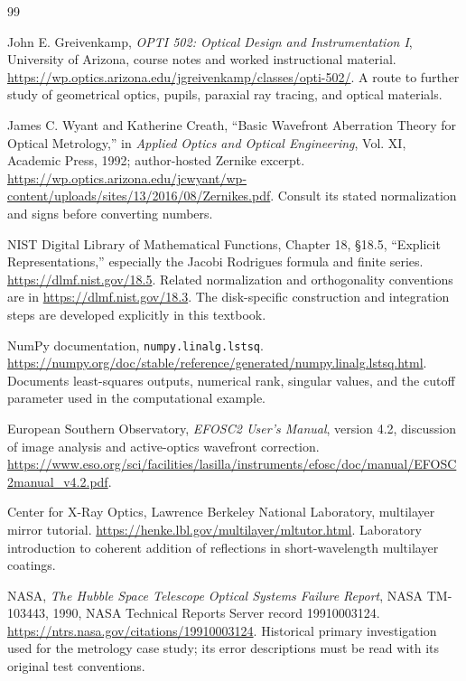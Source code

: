 \begin{thebibliography}{99}
\raggedright
{}
John E. Greivenkamp, \emph{OPTI 502: Optical Design and Instrumentation I},
University of Arizona, course notes and worked instructional material.
\url{https://wp.optics.arizona.edu/jgreivenkamp/classes/opti-502/}.
A route to further study of geometrical optics, pupils, paraxial
ray tracing, and optical materials.

James C. Wyant and Katherine Creath, ``Basic Wavefront Aberration Theory
for Optical Metrology,'' in \emph{Applied Optics and Optical Engineering},
Vol. XI, Academic Press, 1992; author-hosted Zernike excerpt.
\url{https://wp.optics.arizona.edu/jcwyant/wp-content/uploads/sites/13/2016/08/Zernikes.pdf}.
Consult its stated normalization and signs before converting numbers.

NIST Digital Library of Mathematical Functions, Chapter 18,
\S18.5, ``Explicit Representations,'' especially the Jacobi Rodrigues
formula and finite series.
\url{https://dlmf.nist.gov/18.5}.
Related normalization and orthogonality conventions are in
\url{https://dlmf.nist.gov/18.3}.
The disk-specific construction and integration steps are developed
explicitly in this textbook.

NumPy documentation, \texttt{numpy.linalg.lstsq}.
\url{https://numpy.org/doc/stable/reference/generated/numpy.linalg.lstsq.html}.
Documents least-squares outputs, numerical rank, singular values,
and the cutoff parameter used in the computational example.

European Southern Observatory, \emph{EFOSC2 User's Manual}, version 4.2,
discussion of image analysis and active-optics wavefront correction.
\url{https://www.eso.org/sci/facilities/lasilla/instruments/efosc/doc/manual/EFOSC2manual_v4.2.pdf}.

Center for X-Ray Optics, Lawrence Berkeley National Laboratory,
multilayer mirror tutorial.
\url{https://henke.lbl.gov/multilayer/mltutor.html}.
Laboratory introduction to coherent addition of reflections in
short-wavelength multilayer coatings.

NASA, \emph{The Hubble Space Telescope Optical Systems Failure Report},
NASA TM-103443, 1990, NASA Technical Reports Server record 19910003124.
\url{https://ntrs.nasa.gov/citations/19910003124}.
Historical primary investigation used for the metrology case study;
its error descriptions must be read with its original test conventions.
\end{thebibliography}
